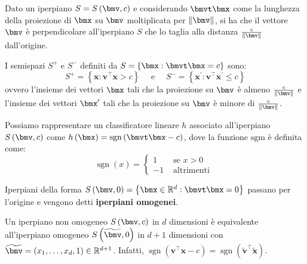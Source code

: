 \documentclass[\main/main.tex]{subfiles}
\begin{document}
\begin{multicols}{2}
\begin{property}
    Dato un iperpiano \(S=S\rnd{\bmv, c}\) e considerando \(\bmvt\bmx\) come la lunghezza della proiezione di \(\bmx\) su \(\bmv\) moltiplicata per \(\norm{\bmv}\), si ha che il vettore \(\bmv\) è perpendicolare all'iperpiano \(S\) che lo taglia alla distanza \(\frac{c}{\norm{\bmv}}\) dall'origine.
\end{property}
\begin{definition}[Semispazi \(S^+\) ed \(S^-\)]
    I semispazi \(S^+\) e \(S^-\) definiti da \(S = \crl{\bmx: \bmvt\bmx = c}\) sono:
    \[
        S^{+}=\left\{\boldsymbol{x} : \boldsymbol{v}^{\top} \boldsymbol{x}>c\right\} \quad \text { e } \quad S^{-}=\left\{\boldsymbol{x}^{\prime} : \boldsymbol{v}^{\top} \boldsymbol{x}^{\prime} \leq c\right\}
    \]
    ovvero l'insieme dei vettori \(\bmx\) tali che la proiezione su \(\bmv\) è almeno \(\frac{c}{\norm{\bmv}}\) e l'insieme dei vettori \(\bmx'\) tali che la proiezione su \(\bmv\) è minore di \(\frac{c}{\norm{\bmv}}\).
\end{definition}
\begin{definition}
    Possiamo rappresentare un classificatore lineare \(h\) associato all'iperpiano \(S\rnd{\bmv, c}\) come \(h\rnd{\bmx} = \text{sgn}\rnd{\bmvt\bmx - c}\), dove la funzione \(\text{sgm}\) è definita come:
    \[
        \operatorname{sgn}(x)=\left\{\begin{array}{cc}{1} & {\text { se } x>0} \\ {-1} & {\text { altrimenti }}\end{array}\right.
    \]
\end{definition}
\begin{definition}
    Iperpiani della forma \(S\rnd{\bmv, 0} = \crl{\bmx \in \R^d: \bmvt\bmx = 0}\) passano per l'origine e vengono detti \textbf{iperpiani omogenei}.
\end{definition}
\begin{definition}
    Un iperpiano non omogeneo \(S\rnd{\bmv, c}\) in \(d\) dimensioni è equivalente all'iperpiano omogeneo \(S\rnd{\tilde{\bmv}, 0}\) in \(d+1\) dimensioni con \(\tilde{\bmv} = \rnd{x_1, \ldots, x_d, 1} \in \R^{d+1}\). Infatti, \(\operatorname{sgn}\left(\boldsymbol{v}^{\top} \boldsymbol{x}-c\right)=\operatorname{sgn}\left(\widetilde{\boldsymbol{v}}^{\top} \widetilde{\boldsymbol{x}}\right)\).
\end{definition}
\begin{definition}

\end{definition}
\end{multicols}
\end{document}
